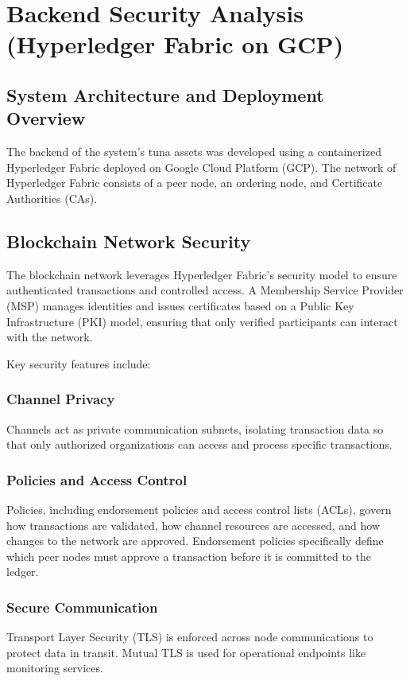 \section{Backend Security Analysis (Hyperledger Fabric on GCP)}

\subsection{System Architecture and Deployment Overview}
The backend of the system’s tuna assets was developed using a containerized Hyperledger Fabric deployed on Google Cloud Platform (GCP). The network of Hyperledger Fabric consists of a peer node, an ordering node, and Certificate Authorities (CAs). 

\subsection{Blockchain Network Security}
The blockchain network leverages Hyperledger Fabric’s security model to ensure authenticated transactions and controlled access. A Membership Service Provider (MSP) manages identities and issues certificates based on a Public Key Infrastructure (PKI) model, ensuring that only verified participants can interact with the network.

Key security features include:

\subsubsection{Channel Privacy}
Channels act as private communication subnets, isolating transaction data so that only authorized organizations can access and process specific transactions.

\subsubsection{Policies and Access Control}
Policies, including endorsement policies and access control lists (ACLs), govern how transactions are validated, how channel resources are accessed, and how changes to the network are approved. Endorsement policies specifically define which peer nodes must approve a transaction before it is committed to the ledger.

\subsubsection{Secure Communication}
Transport Layer Security (TLS) is enforced across node communications to protect data in transit. Mutual TLS is used for operational endpoints like monitoring services.

